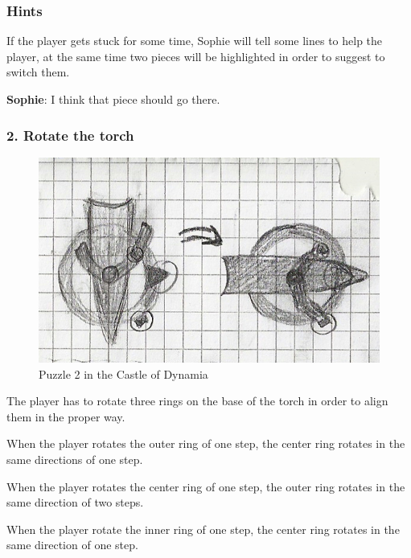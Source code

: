 \subsubsection*{Hints}
If the player gets stuck for some time, Sophie will tell some lines to help the player, at the same time two pieces will be highlighted in order to suggest to switch them.

\textbf{Sophie}: I think that piece should go there.

\subsubsection{2. Rotate the torch}

\begin{figure}[H]
  \centering
  \includegraphics[width=\textwidth]{Images/Puzzles/castleOfDynamia_2}
  \caption{Puzzle 2 in the Castle of Dynamia}
\end{figure}



The player has to rotate three rings on the base of the torch in order to align them in the proper way.

When the player rotates the outer ring of one step, the center ring rotates in the same directions of one step.

When the player rotates the center ring of one step, the outer ring rotates in the same direction of two steps.

When the player rotate the inner ring of one step, the center ring rotates in the same direction of one step.

